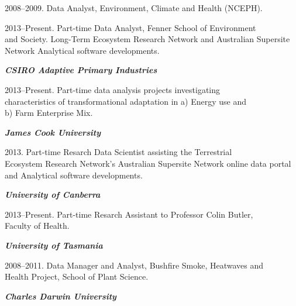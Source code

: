 \documentclass[a4paper,11pt]{article}
\begin{document}
2008--2009. Data Analyst, Environment, Climate and Health (NCEPH).

2013--Present.  Part-time Data Analyst, Fenner School of Environment \\
\ind and Society.  Long-Term Ecosystem Research Network and Australian Supersite Network Analytical software developments.

\noindent\emph{\textbf{CSIRO Adaptive Primary Industries} \vspace{0.01in}}

2013--Present.  Part-time data analysis projects investigating \\
\ind characteristics of transformational adaptation in a) Energy use and \\
\ind b) Farm Enterprise Mix.

\noindent\emph{\textbf{James Cook University} \vspace{0.01in}}

2013.  Part-time Resarch Data Scientist assisting the Terrestrial \\
\ind Ecosystem Research Network's Australian Supersite Network online data portal and Analytical software developments.


\noindent\emph{\textbf{University of Canberra} \vspace{0.01in}}

2013--Present.  Part-time Resarch Assistant to Professor Colin Butler, \\
\ind Faculty of Health.

\medskip
\noindent\emph{\textbf{University of Tasmania} \vspace{0.01in}}

2008--2011. Data Manager and Analyst, Bushfire Smoke, Heatwaves and \\
\ind Health Project,    School of Plant Science.

\medskip

\noindent\emph{\textbf{Charles Darwin University} \vspace{0.01in}}
\end{document}
